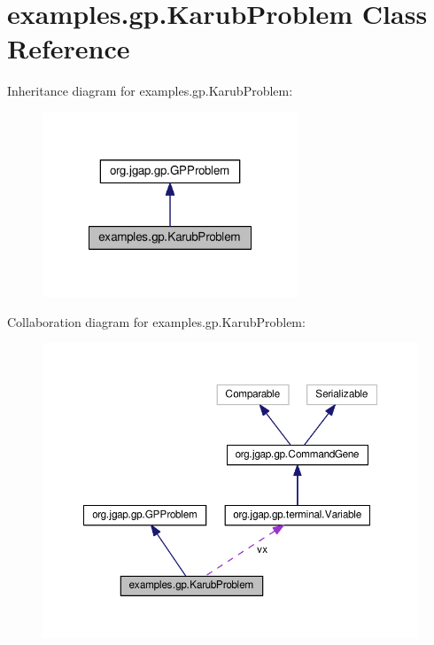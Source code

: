 \hypertarget{classexamples_1_1gp_1_1_karub_problem}{\section{examples.\-gp.\-Karub\-Problem Class Reference}
\label{classexamples_1_1gp_1_1_karub_problem}
}


Inheritance diagram for examples.\-gp.\-Karub\-Problem\-:
\nopagebreak
\begin{figure}[H]
\begin{center}
\leavevmode
\includegraphics[width=216pt]{classexamples_1_1gp_1_1_karub_problem__inherit__graph}
\end{center}
\end{figure}


Collaboration diagram for examples.\-gp.\-Karub\-Problem\-:
\nopagebreak
\begin{figure}[H]
\begin{center}
\leavevmode
\includegraphics[width=350pt]{classexamples_1_1gp_1_1_karub_problem__coll__graph}
\end{center}
\end{figure}
